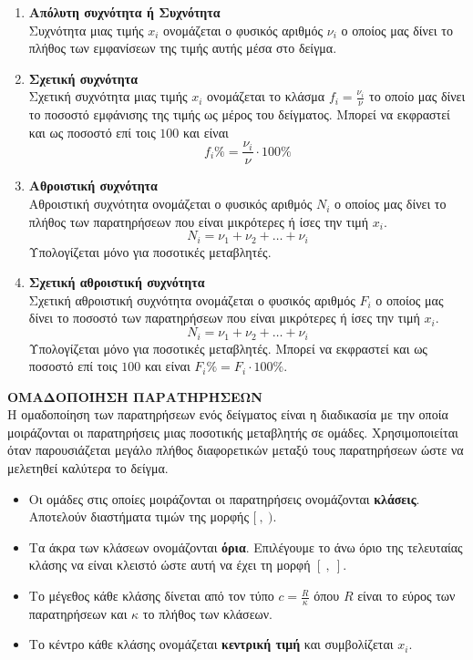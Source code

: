 \documentclass[twoside,11pt,a4paper,openany]{book}
\def\xrwma{red!70!black}
\newcounter{orismos}[chapter]
\renewcommand{\theorismos}{\arabic{orismos}}
\newcommand{\Orismos}[1]{\refstepcounter{orismos}{\textbf{\textbf{\textcolor{\xrwma}{{\large Ορισμός\hspace{2mm}\thechapter.\theorismos\;}:\;}}}}\hspace{1mm} \MakeUppercase{\textbf{#1}\\}}{}
\begin{document}
\begin{enumerate}[label=\bf\arabic*.,itemsep=0mm]
\item \textbf{Απόλυτη συχνότητα ή Συχνότητα}\\
Συχνότητα μιας τιμής $ x_i $ ονομάζεται ο φυσικός αριθμός $ \nu_i $ ο οποίος μας δίνει το πλήθος των εμφανίσεων της τιμής αυτής μέσα στο δείγμα.
\item \textbf{Σχετική συχνότητα}\\
Σχετική συχνότητα μιας τιμής $ x_i $ ονομάζεται το κλάσμα $ f_i=\frac{\nu_i}{\nu} $ το οποίο μας δίνει το ποσοστό εμφάνισης της τιμής ως μέρος του δείγματος. Μπορεί να εκφραστεί και ως ποσοστό επί τοις $ 100 $ και είναι \[ f_i\%=\frac{\nu_i}{\nu}\cdot 100\% \]
\item \textbf{Αθροιστική συχνότητα}\\
Αθροιστική συχνότητα ονομάζεται ο φυσικός αριθμός $ N_i $ ο οποίος μας δίνει το πλήθος των παρατηρήσεων που είναι μικρότερες ή ίσες την τιμή $ x_i $.
\[ N_i=\nu_1+\nu_2+\ldots+\nu_i \]
Υπολογίζεται μόνο για ποσοτικές μεταβλητές.
\item \textbf{Σχετική αθροιστική συχνότητα}\\
Σχετική αθροιστική συχνότητα ονομάζεται ο φυσικός αριθμός $ F_i $ ο οποίος μας δίνει το ποσοστό των παρατηρήσεων που είναι μικρότερες ή ίσες την τιμή $ x_i $.
\[ N_i=\nu_1+\nu_2+\ldots+\nu_i \]
Υπολογίζεται μόνο για ποσοτικές μεταβλητές. Μπορεί να εκφραστεί και ως ποσοστό επί τοις $ 100 $ και είναι $ F_i\%=F_i\cdot 100\% $.
\end{enumerate}
\Orismos{Ομαδοποίηση παρατηρήσεων}
Η ομαδοποίηση των παρατηρήσεων ενός δείγματος είναι η διαδικασία με την οποία μοιράζονται οι παρατηρήσεις μιας ποσοτικής μεταβλητής σε ομάδες. Χρησιμοποιείται όταν παρουσιάζεται μεγάλο πλήθος διαφορετικών μεταξύ τους παρατηρήσεων ώστε να μελετηθεί καλύτερα το δείγμα.
\begin{itemize}
\item Οι ομάδες στις οποίες μοιράζονται οι παρατηρήσεις ονομάζονται \textbf{κλάσεις}. Αποτελούν διαστήματα τιμών της μορφής $ [\ ,\ ) $.
\item Τα άκρα των κλάσεων ονομάζονται \textbf{όρια}. Επιλέγουμε το άνω όριο της τελευταίας κλάσης να είναι κλειστό ώστε αυτή να έχει τη μορφή $ [\ ,\ ] $.
\item Το μέγεθος κάθε κλάσης δίνεται από τον τύπο $ c=\frac{R}{\kappa} $ όπου $ R $ είναι το εύρος των παρατηρήσεων και $ \kappa $ το πλήθος των κλάσεων.
\item Το κέντρο κάθε κλάσης ονομάζεται \textbf{κεντρική τιμή} και συμβολίζεται $ x_i $.
\end{itemize}
\end{document}
